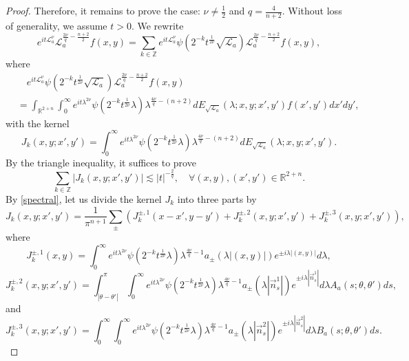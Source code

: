 \documentclass[10pt,a4paper]{amsart}
\begin{document}
\begin{proof}
Therefore, it remains to prove the case: $\nu\not=\frac{1}{2}$ and $q=\frac{4}{n+2}$. Without loss of generality, we assume $t>0$.
We rewrite
\begin{equation*}
e^{it\mathcal{L}_a^\nu} \mathcal{L}_a^{\frac{2\nu}{q}-\frac{n+2}{2}}f(x,y)=\sum_{k\in\mathbb{Z}}e^{it\mathcal{L}_a^\nu} \psi(2^{-k}t^\frac{1}{2\nu}\sqrt{\mathcal{L}_a})\mathcal{L}_a^{\frac{2\nu}{q}-\frac{n+2}{2}}f(x,y),
\end{equation*}
where 
\begin{align*}
&\quad e^{it\mathcal{L}_a^\nu} \psi(2^{-k}t^\frac{1}{2\nu}\sqrt{\mathcal{L}_a})\mathcal{L}_a^{\frac{2\nu}{q}-\frac{n+2}{2}}f(x,y)\\
&=\int_{\mathbb{R}^{2+n}}\int_0^\infty e^{it\lambda^{2\nu}} \psi(2^{-k}t^\frac{1}{2\nu}\lambda)\lambda^{\frac{4\nu}{q}-(n+2)}dE_{\sqrt{\mathcal{L}_a}}(\lambda; x,y; x',y')f(x',y')dx'dy',
\end{align*}
with the kernel
\begin{equation*}
J_k(x,y;x',y')=\int_0^\infty e^{it\lambda^{2\nu}} \psi(2^{-k}t^\frac{1}{2\nu}\lambda)\lambda^{\frac{4\nu}{q}-(n+2)}dE_{\sqrt{\mathcal{L}_a}}(\lambda; x,y; x',y').
\end{equation*}
By the triangle inequality, it suffices to prove
\begin{equation}\label{key kernel}
\sum_{k\in\mathbb{Z}}|J_k(x,y;x',y')|\lesssim |t|^{-\frac{2}{q}}, \quad\forall (x,y),(x',y')\in\mathbb{R}^{2+n}.
\end{equation}
By \eqref{spectral}, let us divide the kernel $J_k$ into three parts by
\begin{equation*}
J_k(x,y;x',y')=\frac{1}{\pi^{n+1}}\sum_{\pm}\left(J_k^{\pm,1}(x-x',y-y')+J_k^{\pm,2}(x,y;x',y')+J_k^{\pm,3}(x,y;x',y')\right), 
\end{equation*}
where
\begin{equation*}
J_k^{\pm,1}(x,y)=\int_0^\infty  e^{it\lambda^{2\nu}} \psi(2^{-k}t^\frac{1}{2\nu}\lambda)\lambda^{\frac{4\nu}{q}-1}a_{\pm}(\lambda|(x,y)|)e^{\pm i\lambda|(x,y)|}d\lambda,
\end{equation*}
\begin{equation*}
J_k^{\pm,2}(x,y;x',y')=\int_{|\theta-\theta'|}^\pi \int_0^\infty   e^{it\lambda^{2\nu}} \psi(2^{-k}t^\frac{1}{2\nu}\lambda)\lambda^{\frac{4\nu}{q}-1}a_{\pm}(\lambda|\overset{\rightarrow}{n}_s^1|)e^{\pm i\lambda|\overset{\rightarrow}{n}_s^1|}d\lambda A_a(s;\theta,\theta')ds,
\end{equation*}
and
\begin{equation*}
J_k^{\pm,3}(x,y;x',y')=\int_0^\infty \int_0^\infty   e^{it\lambda^{2\nu}} \psi(2^{-k}t^\frac{1}{2\nu}\lambda)\lambda^{\frac{4\nu}{q}-1}a_{\pm}(\lambda|\overset{\rightarrow}{n}_s^2|)e^{\pm i\lambda|\overset{\rightarrow}{n}_s^2|}d\lambda B_a(s;\theta,\theta')ds.

\end{equation*}
\end{proof}
\end{document}

